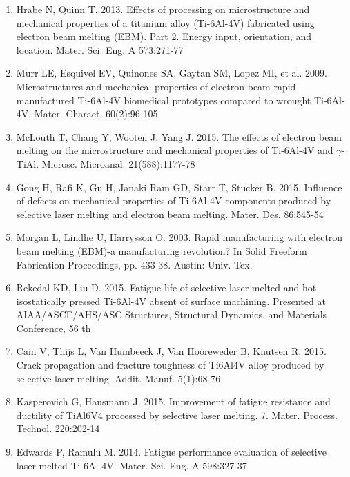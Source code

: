 \documentclass[10pt]{article}
\begin{document}
\begin{enumerate}
  \item Hrabe N, Quinn T. 2013. Effects of processing on microstructure and mechanical properties of a titanium alloy (Ti-6Al-4V) fabricated using electron beam melting (EBM). Part 2. Energy input, orientation, and location. Mater. Sci. Eng. A 573:271-77

  \item Murr LE, Esquivel EV, Quinones SA, Gaytan SM, Lopez MI, et al. 2009. Microstructures and mechanical properties of electron beam-rapid manufactured Ti-6Al-4V biomedical prototypes compared to wrought Ti-6Al-4V. Mater. Charact. 60(2):96-105

  \item McLouth T, Chang Y, Wooten J, Yang J. 2015. The effects of electron beam melting on the microstructure and mechanical properties of Ti-6Al-4V and $\gamma$-TiAl. Microsc. Microanal. 21(588):1177-78

  \item Gong H, Rafi K, Gu H, Janaki Ram GD, Starr T, Stucker B. 2015. Influence of defects on mechanical properties of Ti-6Al-4V components produced by selective laser melting and electron beam melting. Mater. Des. 86:545-54

  \item Morgan L, Lindhe U, Harrysson O. 2003. Rapid manufacturing with electron beam melting (EBM)-a manufacturing revolution? In Solid Freeform Fabrication Proceedings, pp. 433-38. Austin: Univ. Tex.

  \item Rekedal KD, Liu D. 2015. Fatigue life of selective laser melted and hot isostatically pressed Ti-6Al-4V absent of surface machining. Presented at AIAA/ASCE/AHS/ASC Structures, Structural Dynamics, and Materials Conference, 56 th

  \item Cain V, Thijs L, Van Humbeeck J, Van Hooreweder B, Knutsen R. 2015. Crack propagation and fracture toughness of Ti6Al4V alloy produced by selective laser melting. Addit. Manuf. 5(1):68-76

  \item Kasperovich G, Hausmann J. 2015. Improvement of fatigue resistance and ductility of TiAl6V4 processed by selective laser melting. 7. Mater. Process. Technol. 220:202-14

  \item Edwards P, Ramulu M. 2014. Fatigue performance evaluation of selective laser melted Ti-6Al-4V. Mater. Sci. Eng. A 598:327-37


\end{enumerate}
\end{document}
